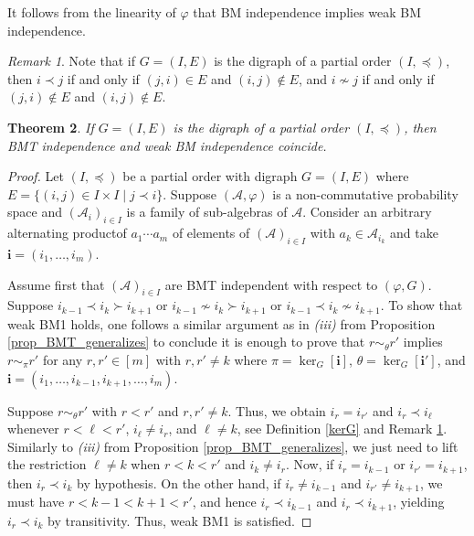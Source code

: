 \documentclass[a4paper,12pt]{extarticle}
\newtheorem{thm}{Theorem}[section]
\theoremstyle{definition}
\theoremstyle{remark}
\newtheorem{rem}[thm]{Remark}
\def\AA{\mathcal{A}}
\begin{document}
It follows from  the linearity of $\varphi$ that  BM independence implies weak BM independence. 


\begin{rem}\label{rmk_digraph_partial}
	Note that if $G=(I,E)$ is the digraph of a partial order $(I,\preceq)$, then $i\prec j$ if and only if $(j,i)\in E$ and $(i,j)\notin E$, and $i\nsim j$ if and only if $(j,i)\notin E$ and $(i,j)\notin E$. 
\end{rem}


\begin{thm}\label{digraphorder} 
	If $G = (I,E)$ is the digraph of a partial order $(I,\preceq)$, then BMT independence and weak BM independence coincide. 
\end{thm}
\begin{proof}
%
Let $(I,\preceq)$ be a partial order with digraph $G = (I,E)$ where $E = \{ (i,j) \in I \times I \mid j \prec i \}$. 
%
Suppose $(\AA,\varphi)$ is a non-commutative probability space and $(\mathcal{A}_i)_{i \in I}$ is a family of sub-algebras of $\mathcal{A}$. 
%
Consider an arbitrary alternating productof $a_1\cdots a_m$ of elements of $(\AA)_{i\in I}$ with $a_k \in \AA_{i_k}$ and take $\bm{i}=(i_1,\ldots, i_m)$. 
%
%
%
%

Assume first that $(\AA)_{i\in I}$ are BMT independent with respect to $(\varphi,G)$.
%
Suppose $i_{k-1} \prec i_k \succ i_{k+1}$ or $ i_{k-1} \nsim i_k \succ i_{k+1}$ or $ i_{k-1} \prec i_k \nsim i_{k+1}$. 
%
To show that weak BM1 holds, one follows a similar argument as in \emph{(iii)} from Proposition \ref{prop_BMT_generalizes} to conclude it is enough to prove that $r\sim_\theta r'$ implies $r\sim_\pi r'$  for any $r, r' \in  [m] $ with $r,r'  \neq k$ where $\pi=\ker_G[\bm{i}]$, $\theta = \ker_G[\bm{i}']$, and $\bm{i}=(i_1,\ldots,i_{k-1},i_{k+1},\ldots,i_m)$. 
%
%
%
%

Suppose $r\sim_\theta r'$ with $r<r'$ and $r,r'  \neq k$.
%
Thus, we obtain $i_r=i_{r'}$ and $i_r \prec i_{\ell}$ whenever $r< \ell <r'$, $i_\ell \neq i_r$, and $\ell \neq k$, see Definition \ref{kerG} and Remark \ref{rmk_digraph_partial}. 
%
Similarly to \emph{(iii)} from Proposition \ref{prop_BMT_generalizes}, we just need to lift the restriction $\ell \neq k$ when $r<k<r'$ and $i_k \neq i_r$. 
%
Now, if $i_r = i_{k-1}$ or $i_{r'} = i_{k+1}$, then  $i_r \prec i_k$ by hypothesis. 
% 
On the other hand, if  $i_r \neq i_{k-1}$ and $i_{r'} \neq i_{k+1}$, we must have $r < k-1 < k+1 <r'$, and hence $i_r \prec i_{k-1}$ and $i_r \prec i_{k+1}$, yielding $i_r \prec i_k$ by transitivity. 
%
Thus, weak BM1 is satisfied. 
%
%
%
%


\end{proof}
\end{document}
